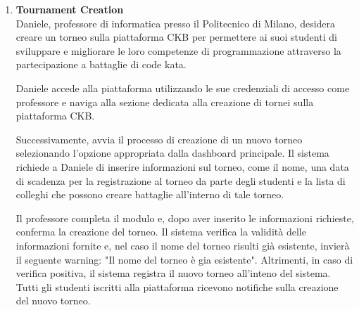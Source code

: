 \begin{enumerate}[label=\textbf{\Alph*}.]
    \item \textbf{Tournament Creation} \\ 
    Daniele, professore di informatica presso il Politecnico di Milano, desidera creare un torneo sulla piattaforma CKB per permettere ai suoi studenti di sviluppare e migliorare le loro competenze di programmazione attraverso la partecipazione a battaglie di code kata.

Daniele accede alla piattaforma utilizzando le sue credenziali di accesso come professore e naviga alla sezione dedicata alla creazione di tornei sulla piattaforma CKB.

Successivamente, avvia il processo di creazione di un nuovo torneo selezionando l'opzione appropriata dalla dashboard principale. Il sistema richiede a Daniele di inserire  informazioni sul torneo, come il nome, una data di scadenza per la registrazione al torneo da parte degli studenti e la lista di colleghi che possono creare battaglie all'interno di tale torneo.

Il professore completa il modulo e, dopo aver inserito  le informazioni richieste, conferma la creazione del torneo. Il sistema verifica la validità delle informazioni fornite e, nel caso il nome del torneo risulti già esistente,  invierà il seguente warning:
"Il nome del torneo è gia esistente".
Altrimenti, in caso di verifica positiva, il sistema registra il nuovo torneo all'inteno del sistema. 
Tutti gli  studenti iscritti alla piattaforma ricevono notifiche sulla creazione del nuovo torneo.


\end{enumerate}
